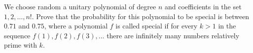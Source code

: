 We choose random a unitary polynomial of degree $n$ and coefficients in the set $1,2,\ldots,n!$. Prove that the probability for this polynomial to be special is between $0.71$ and $0.75$, where a polynomial $f$ is called special if for every $k>1$ in the sequence $f(1), f(2), f(3),...$ there are infinitely many numbers relatively prime with $k$.